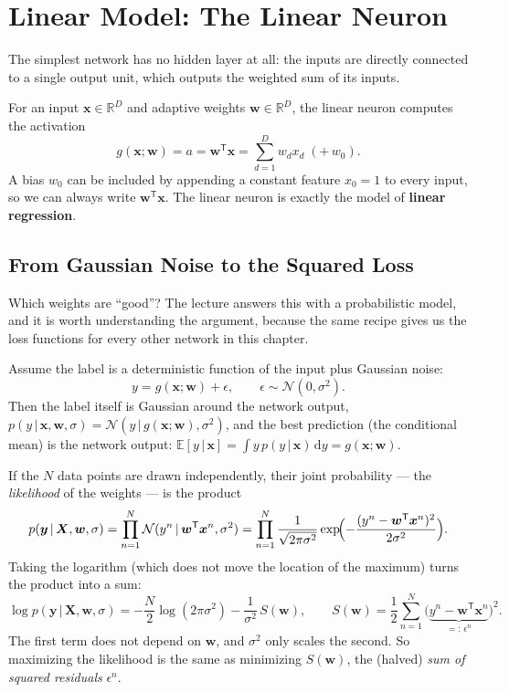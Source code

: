 \documentclass[11pt, oneside]{book}
\newcommand{\R}{\mathbb{R}}
\newcommand{\E}{\mathbb{E}}              %
\newcommand{\Prob}{\mathbb{P}}           %
\newcommand{\dd}{\,\mathrm{d}}
\newcommand{\T}{^{\mathsf{T}}}           %
\newcommand{\Normal}{\mathcal{N}}
\newcommand{\given}{\,\vert\,}           %
\newcommand{\bx}{\bm{x}}        \newcommand{\by}{\bm{y}}
\newcommand{\bw}{\bm{w}}        \newcommand{\bW}{\bm{W}}
\newcommand{\bX}{\bm{X}}        \newcommand{\bY}{\bm{Y}}
\let\originalsection\section
\renewcommand{\section}{\Needspace{7\baselineskip}\originalsection}
\let\originalsubsection\subsection
\renewcommand{\subsection}{\Needspace{6\baselineskip}\originalsubsection}
\begin{document}
\section{Linear Model: The Linear Neuron}
\label{sec:linear-neuron}

The simplest network has no hidden layer at all: the inputs are directly
connected to a single output unit, which outputs the weighted sum of its
inputs.

\begin{defbox}[title={Linear neuron}]
For an input $\bx \in \R^D$ and adaptive weights $\bw \in \R^D$, the linear
neuron computes the activation
\[
  g(\bx; \bw) = a = \bw\T\bx = \sum_{d=1}^{D} w_d x_d \;(+\, w_0).
\]
A bias $w_0$ can be included by appending a constant feature $x_0 = 1$ to
every input, so we can always write $\bw\T\bx$. The linear neuron is exactly
the model of \textbf{linear regression}.
\end{defbox}

\subsection{From Gaussian Noise to the Squared Loss}

Which weights are ``good''? The lecture answers this with a probabilistic
model, and it is worth understanding the argument, because the same recipe
gives us the loss functions for every other network in this chapter.

Assume the label is a deterministic function of the input plus Gaussian
noise:
\[
  y = g(\bx; \bw) + \epsilon, \qquad \epsilon \sim \Normal(0, \sigma^2).
\]
Then the label itself is Gaussian around the network output,
$p(y \given \bx, \bw, \sigma) = \Normal(y \given g(\bx;\bw), \sigma^2)$,
and the best prediction (the conditional mean) is the network output:
$\E[y \given \bx] = \int y\, p(y \given \bx) \dd y = g(\bx; \bw)$.

If the $N$ data points are drawn independently, their joint probability ---
the \emph{likelihood} of the weights --- is the product
\[
  p(\by \given \bX, \bw, \sigma)
  = \prod_{n=1}^{N} \Normal(y^n \given \bw\T\bx^n, \sigma^2)
  = \prod_{n=1}^{N} \frac{1}{\sqrt{2\pi\sigma^2}}
    \exp\!\Bigl(-\frac{(y^n - \bw\T\bx^n)^2}{2\sigma^2}\Bigr).
\]
Taking the logarithm (which does not move the location of the maximum)
turns the product into a sum:
\[
  \log p(\by \given \bX, \bw, \sigma)
  = -\frac{N}{2}\log(2\pi\sigma^2) - \frac{1}{\sigma^2}\, S(\bw),
  \qquad
  S(\bw) = \frac12 \sum_{n=1}^{N} \bigl(\underbrace{y^n - \bw\T\bx^n}_{=:\,\epsilon^n}\bigr)^2 .
\]
The first term does not depend on $\bw$, and $\sigma^2$ only scales the
second. So maximizing the likelihood is the same as minimizing $S(\bw)$, the
(halved) \emph{sum of squared residuals} $\epsilon^n$.
\end{document}

